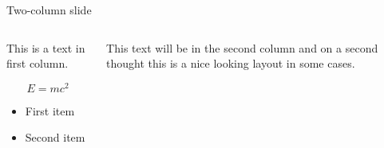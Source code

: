\documentclass{ibeamer}
\begin{document}
\begin{frame}{Two-column slide}
	\begin{columns}
		\begin{column}{0.5 \linewidth}
			This is a text in first column.

			\begin{equation*}
				E = m c^2
			\end{equation*}

			\begin{itemize}
				\item First item
				\item Second item
			\end{itemize}
		\end{column}
		\begin{column}{0.5 \linewidth}
			This text will be in the second column and on a second thought this is a nice looking layout in some cases.
		\end{column}
	\end{columns}
\end{frame}
\end{document}
